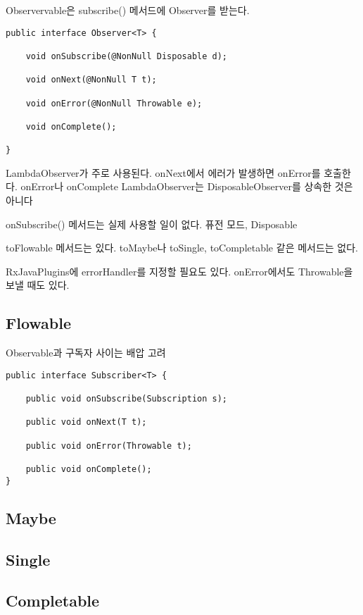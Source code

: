 \documentclass{book}
\begin{document}
Observervable은 subscribe() 메서드에 Observer를 받는다.

\begin{verbatim}
public interface Observer<T> {

    void onSubscribe(@NonNull Disposable d);

    void onNext(@NonNull T t);

    void onError(@NonNull Throwable e);

    void onComplete();

}
\end{verbatim}

LambdaObserver가 주로 사용된다.
onNext에서 에러가 발생하면 onError를 호출한다.
onError나 onComplete
LambdaObserver는 DisposableObserver를 상속한 것은 아니다

onSubscribe() 메서드는 실제 사용할 일이 없다.
퓨전 모드, Disposable

toFlowable 메서드는 있다.
toMaybe나 toSingle, toCompletable 같은 메서드는 없다.

RxJavaPlugins에 errorHandler를 지정할 필요도 있다. onError에서도 Throwable을 보낼 때도 있다.

\subsection{Flowable}
Observable과 구독자 사이는 배압 고려

\begin{verbatim}
public interface Subscriber<T> {

    public void onSubscribe(Subscription s);

    public void onNext(T t);

    public void onError(Throwable t);

    public void onComplete();
} 
\end{verbatim}

\subsection{Maybe}

\subsection{Single}

\subsection{Completable}
\end{document}

